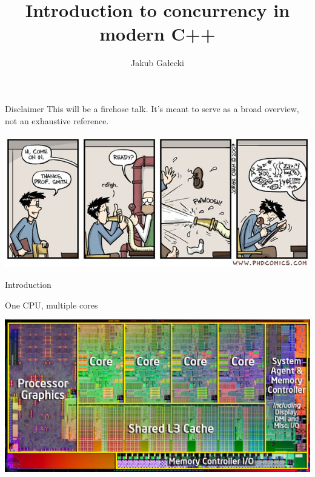 \documentclass{beamer}
\title{Introduction to concurrency in modern C++}
\date{\vspace{5pt}\formatdate{16}{1}{2023}}
\author{Jakub Gałecki}
\begin{document}
\maketitle


\begin{frame}{Disclaimer}
This will be a firehose talk.
It's meant to serve as a broad overview, not an exhaustive reference.
\begin{center}
\vspace{.1cm}
\includegraphics[width=\linewidth]{firehose.jpg}
\end{center}
\end{frame}

\begin{frame}[standout]
Introduction
\end{frame}

\begin{frame}{One CPU, multiple cores}
\begin{center}
\includegraphics[width=\linewidth]{cpu_die.jpg}
\end{center}
\end{frame}
\end{document}
